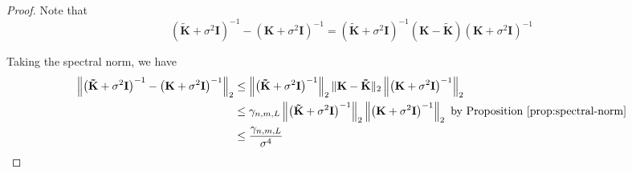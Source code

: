\begin{proof}
    Note that
\[
\left(\mathbf{\tilde{K}} + \sigma^2 \mathbf{I}\right)^{-1} - \left(\mathbf{K} + \sigma^2 \mathbf{I}\right)^{-1} = \left(\mathbf{\tilde{K}} + \sigma^2 \mathbf{I}\right)^{-1} (\mathbf{K} - \mathbf{\tilde{K}}) \left(\mathbf{K} + \sigma^2 \mathbf{I}\right)^{-1}
\]

Taking the spectral norm, we have
\[
\begin{aligned}
\left\|\left(\mathbf{\tilde{K}} + \sigma^2 \mathbf{I}\right)^{-1} - \left(\mathbf{K} + \sigma^2 \mathbf{I}\right)^{-1}\right\|_2 &\leq \left\|\left(\mathbf{\tilde{K}} + \sigma^2 \mathbf{I}\right)^{-1}\right\|_2 \|\mathbf{K} - \mathbf{\tilde{K}}\|_2 \left\|\left(\mathbf{K} + \sigma^2 \mathbf{I}\right)^{-1}\right\|_2 \\
&\leq \gamma_{n, m, L}\left\|\left(\mathbf{\tilde{K}} + \sigma^2 \mathbf{I}\right)^{-1}\right\|_2 \left\|\left(\mathbf{K} + \sigma^2 \mathbf{I}\right)^{-1}\right\|_2\textrm{ by Proposition \ref{prop:spectral-norm}}\\
&\leq   \frac{\gamma_{n, m, L}}{\sigma^4}
\end{aligned}
\]

\end{proof}
